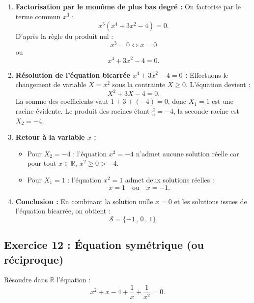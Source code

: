 \documentclass[11pt,a4paper]{article}
\newcommand{\R}{\mathbb{R}}
\begin{document}
\begin{correctionbox}
\begin{enumerate}
    \item \textbf{Factorisation par le monôme de plus bas degré :}
    On factorise par le terme commun $x^3$ :
    \[
    x^3 (x^4 + 3x^2 - 4) = 0.
    \]
    D'après la règle du produit nul :
    \[
    x^3 = 0 \iff x = 0
    \]
    ou
    \[
    x^4 + 3x^2 - 4 = 0.
    \]

    \item \textbf{Résolution de l'équation bicarrée $x^4 + 3x^2 - 4 = 0$ :}
    Effectuons le changement de variable $X = x^2$ sous la contrainte $X \ge 0$. L'équation devient :
    \[
    X^2 + 3X - 4 = 0.
    \]
    La somme des coefficients vaut $1 + 3 + (-4) = 0$, donc $X_1 = 1$ est une racine évidente.
    Le produit des racines étant $\frac{c}{a} = -4$, la seconde racine est $X_2 = -4$.

    \item \textbf{Retour à la variable $x$ :}
    \begin{itemize}
        \item Pour $X_2 = -4$ : l'équation $x^2 = -4$ n'admet aucune solution réelle car pour tout $x \in \R$, $x^2 \ge 0 > -4$.
        \item Pour $X_1 = 1$ : l'équation $x^2 = 1$ admet deux solutions réelles :
        \[
        x = 1 \quad \text{ou} \quad x = -1.
        \]
    \end{itemize}

    \item \textbf{Conclusion :}
    En combinant la solution nulle $x = 0$ et les solutions issues de l'équation bicarrée, on obtient :
    \[
    \mathcal{S} = \{-1\,,\, 0\,,\, 1\}.
    \]
\end{enumerate}
\end{correctionbox}

\subsection*{Exercice 12 : Équation symétrique (ou réciproque)}
Résoudre dans $\R$ l'équation :
\[
x^2 + x - 4 + \frac{1}{x} + \frac{1}{x^2} = 0.
\]
\end{document}
